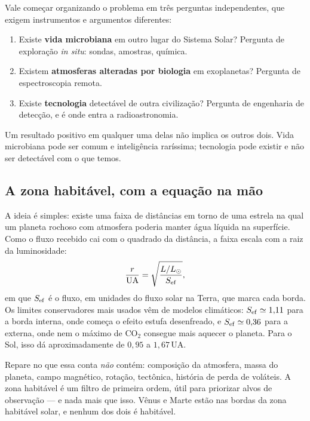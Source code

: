 \documentclass[11pt,a4paper]{article}
\begin{document}
Vale começar organizando o problema em três perguntas independentes, que exigem instrumentos e argumentos diferentes:

\begin{enumerate}
\item Existe \textbf{vida microbiana} em outro lugar do Sistema Solar? Pergunta de exploração \textit{in situ}: sondas, amostras, química.
\item Existem \textbf{atmosferas alteradas por biologia} em exoplanetas? Pergunta de espectroscopia remota.
\item Existe \textbf{tecnologia} detectável de outra civilização? Pergunta de engenharia de detecção, e é onde entra a radioastronomia.
\end{enumerate}

Um resultado positivo em qualquer uma delas não implica os outros dois. Vida microbiana pode ser comum e inteligência raríssima; tecnologia pode existir e não ser detectável com o que temos.

\subsection*{A zona habitável, com a equação na mão}

A ideia é simples: existe uma faixa de distâncias em torno de uma estrela na qual um planeta rochoso com atmosfera poderia manter água líquida na superfície. Como o fluxo recebido cai com o quadrado da distância, a faixa escala com a raiz da luminosidade:
\[
\frac{r}{\mathrm{UA}}=\sqrt{\frac{L/L_\odot}{S_{\rm ef}}},
\]
em que $S_{\rm ef}$ é o fluxo, em unidades do fluxo solar na Terra, que marca cada borda. Os limites conservadores mais usados vêm de modelos climáticos: $S_{\rm ef}\simeq1{,}11$ para a borda interna, onde começa o efeito estufa desenfreado, e $S_{\rm ef}\simeq0{,}36$ para a externa, onde nem o máximo de CO$_2$ consegue mais aquecer o planeta. Para o Sol, isso dá aproximadamente de $0{,}95$ a $1{,}67\,\mathrm{UA}$.

Repare no que essa conta \emph{não} contém: composição da atmosfera, massa do planeta, campo magnético, rotação, tectônica, história de perda de voláteis. A zona habitável é um filtro de primeira ordem, útil para priorizar alvos de observação --- e nada mais que isso. Vênus e Marte estão nas bordas da zona habitável solar, e nenhum dos dois é habitável.
\end{document}
